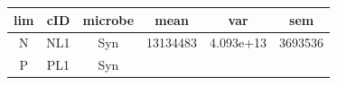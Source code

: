 \documentclass[]{article}
\begin{document}
\begin{longtable}[]{@{}cccccc@{}}
\toprule
\begin{minipage}[b]{0.07\columnwidth}\centering\strut
lim\strut
\end{minipage} & \begin{minipage}[b]{0.07\columnwidth}\centering\strut
cID\strut
\end{minipage} & \begin{minipage}[b]{0.12\columnwidth}\centering\strut
microbe\strut
\end{minipage} & \begin{minipage}[b]{0.10\columnwidth}\centering\strut
mean\strut
\end{minipage} & \begin{minipage}[b]{0.12\columnwidth}\centering\strut
var\strut
\end{minipage} & \begin{minipage}[b]{0.12\columnwidth}\centering\strut
sem\strut
\end{minipage}\tabularnewline
\midrule
\endhead
\begin{minipage}[t]{0.07\columnwidth}\centering\strut
N\strut
\end{minipage} & \begin{minipage}[t]{0.07\columnwidth}\centering\strut
NL1\strut
\end{minipage} & \begin{minipage}[t]{0.12\columnwidth}\centering\strut
Syn\strut
\end{minipage} & \begin{minipage}[t]{0.10\columnwidth}\centering\strut
13134483\strut
\end{minipage} & \begin{minipage}[t]{0.12\columnwidth}\centering\strut
4.093e+13\strut
\end{minipage} & \begin{minipage}[t]{0.12\columnwidth}\centering\strut
3693536\strut
\end{minipage}\tabularnewline
\begin{minipage}[t]{0.07\columnwidth}\centering\strut
P\strut
\end{minipage} & \begin{minipage}[t]{0.07\columnwidth}\centering\strut
PL1\strut
\end{minipage} & \begin{minipage}[t]{0.12\columnwidth}\centering\strut
Syn\strut
\end{minipage} & \begin{minipage}[t]{0.10\columnwidth}\centering\strut

\end{minipage}
\end{longtable}
\end{document}
